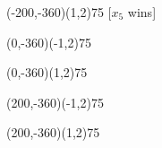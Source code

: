 \documentclass[12pt]{article}
\begin{document}
\begin{figure}[htb]
\begin{egame}
\renewcommand{\egarrowstyle}{e}

\putbranch(-200,-360)(1,2){75}
[$x_5$ wins]





\renewcommand{\egarrowstyle}{e}

\putbranch(0,-360)(-1,2){75}

\renewcommand{\egarrowstyle}{}

\putbranch(0,-360)(1,2){75}




\renewcommand{\egarrowstyle}{}

\putbranch(200,-360)(-1,2){75}

\renewcommand{\egarrowstyle}{e}

\putbranch(200,-360)(1,2){75}





\renewcommand{\egarrowstyle}{e}


\end{egame}
\end{figure}
\end{document}
